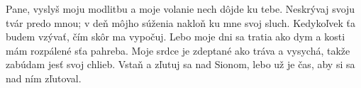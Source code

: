 Pane, vyslyš moju modlitbu
a moje volanie nech dôjde ku tebe.
Neskrývaj svoju tvár predo mnou;
v deň môjho súženia
nakloň ku mne svoj sluch.
\versseparator
Kedykoľvek ťa budem vzývať,
čím skôr ma vypočuj.
\versseparator
Lebo moje dni sa tratia ako dym
a kosti mám rozpálené sťa pahreba.
\versseparator
Moje srdce je zdeptané ako tráva a vysychá,
takže zabúdam jesť svoj chlieb.
\versseparator
Vstaň a zľutuj sa nad Sionom,
lebo už je čas, aby si sa nad ním zľutoval.